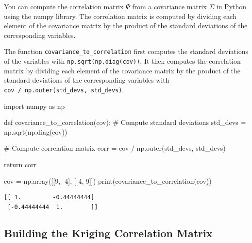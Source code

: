 \documentclass[
  letterpaper,
  DIV=11,
  numbers=noendperiod]{scrreprt}
\newenvironment{Shaded}{\begin{snugshade}}{\end{snugshade}}
\newcommand{\BuiltInTok}[1]{\textcolor[rgb]{0.00,0.23,0.31}{#1}}
\newcommand{\CommentTok}[1]{\textcolor[rgb]{0.37,0.37,0.37}{#1}}
\newcommand{\ControlFlowTok}[1]{\textcolor[rgb]{0.00,0.23,0.31}{#1}}
\newcommand{\DecValTok}[1]{\textcolor[rgb]{0.68,0.00,0.00}{#1}}
\newcommand{\ImportTok}[1]{\textcolor[rgb]{0.00,0.46,0.62}{#1}}
\newcommand{\KeywordTok}[1]{\textcolor[rgb]{0.00,0.23,0.31}{#1}}
\newcommand{\NormalTok}[1]{\textcolor[rgb]{0.00,0.23,0.31}{#1}}
\newcommand{\OperatorTok}[1]{\textcolor[rgb]{0.37,0.37,0.37}{#1}}
\begin{document}
You can compute the correlation matrix \(\Psi\) from a covariance matrix
\(\Sigma\) in Python using the numpy library. The correlation matrix is
computed by dividing each element of the covariance matrix by the
product of the standard deviations of the corresponding variables.

The function \texttt{covariance\_to\_correlation} first computes the
standard deviations of the variables with
\texttt{np.sqrt(np.diag(cov))}. It then computes the correlation matrix
by dividing each element of the covariance matrix by the product of the
standard deviations of the corresponding variables with
\texttt{cov\ /\ np.outer(std\_devs,\ std\_devs)}.

\begin{Shaded}
\begin{Highlighting}[]
\ImportTok{import}\NormalTok{ numpy }\ImportTok{as}\NormalTok{ np}

\KeywordTok{def}\NormalTok{ covariance\_to\_correlation(cov):}
    \CommentTok{\# Compute standard deviations}
\NormalTok{    std\_devs }\OperatorTok{=}\NormalTok{ np.sqrt(np.diag(cov))}
    
    \CommentTok{\# Compute correlation matrix}
\NormalTok{    corr }\OperatorTok{=}\NormalTok{ cov }\OperatorTok{/}\NormalTok{ np.outer(std\_devs, std\_devs)}
    
    \ControlFlowTok{return}\NormalTok{ corr}

\NormalTok{cov }\OperatorTok{=}\NormalTok{ np.array([[}\DecValTok{9}\NormalTok{, }\OperatorTok{{-}}\DecValTok{4}\NormalTok{], [}\OperatorTok{{-}}\DecValTok{4}\NormalTok{, }\DecValTok{9}\NormalTok{]])}
\BuiltInTok{print}\NormalTok{(covariance\_to\_correlation(cov))}
\end{Highlighting}
\end{Shaded}

\begin{verbatim}
[[ 1.         -0.44444444]
 [-0.44444444  1.        ]]
\end{verbatim}

\hypertarget{building-the-kriging-correlation-matrix}{%
\subsection{Building the Kriging Correlation
Matrix}\label{building-the-kriging-correlation-matrix}}
\end{document}
